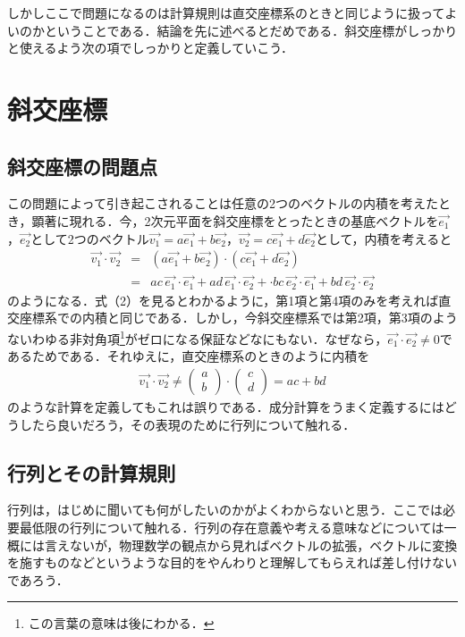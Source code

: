 \documentclass[dvipdfmx,a4]{jsarticle}
\begin{document}
しかしここで問題になるのは計算規則は直交座標系のときと同じように扱ってよいのかということである．結論を先に述べるとだめである．斜交座標がしっかりと使えるよう次の項でしっかりと定義していこう．

\section{斜交座標}
\subsection{斜交座標の問題点}
この問題によって引き起こされることは任意の2つのベクトルの内積を考えたとき，顕著に現れる．今，2次元平面を斜交座標をとったときの基底ベクトルを\(\vec{e_1}\)，\(\vec{e_2}\)として2つのベクトル\(\vec{v_1} = a\vec{e_1} +b\vec{e_2}\)，\(\vec{v_2} = c\vec{e_1} +d\vec{e_2}\)として，内積を考えると
\begin{eqnarray}
  \vec{v_1}\cdot \vec{v_2}
  &=& \left( a\vec{e_1} +b\vec{e_2} \right)\cdot \left( c\vec{e_1} +d\vec{e_2} \right)\\
  &=& ac \, \vec{e_1} \cdot \vec{e_1} + ad\, \vec{e_1} \cdot \vec{e_2} +\cdot bc\, \vec{e_2} \cdot \vec{e_1} +bd\, \vec{e_2} \cdot \vec{e_2} \label{2}
\end{eqnarray}
のようになる．式（2）を見るとわかるように，第1項と第4項のみを考えれば直交座標系での内積と同じである．しかし，今斜交座標系では第2項，第3項のようないわゆる非対角項\footnote{この言葉の意味は後にわかる．}がゼロになる保証などなにもない．なぜなら，\(\vec{e_1} \cdot \vec{e_2} \neq 0\)であるためである．それゆえに，直交座標系のときのように内積を
\begin{eqnarray}
  \vec{v_1} \cdot \vec{v_2} \not=
  \begin{pmatrix}
    a \\
    b
  \end{pmatrix}
  \cdot
  \begin{pmatrix}
    c \\
    d
  \end{pmatrix}
  = ac+bd
\end{eqnarray}
のような計算を定義してもこれは誤りである．成分計算をうまく定義するにはどうしたら良いだろう，その表現のために行列について触れる．

\subsection{行列とその計算規則}
行列は，はじめに聞いても何がしたいのかがよくわからないと思う．ここでは必要最低限の行列について触れる．行列の存在意義や考える意味などについては一概には言えないが，物理数学の観点から見ればベクトルの拡張，ベクトルに変換を施すものなどというような目的をやんわりと理解してもらえれば差し付けないであろう．
\end{document}
